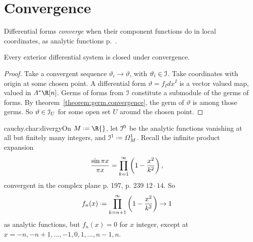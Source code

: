 \section{Convergence}
Differential forms \emph{converge} when their component functions do in local coordinates, as analytic functions p.~\pageref{section:convergence}.
\begin{theorem}\label{theorem:f.t.uniform}
Every exterior differential system is closed under convergence.
\end{theorem}
\begin{proof}
Take a convergent sequence \(\vartheta_i\to\vartheta\), with \(\vartheta_i\in\mathcal{I}\).
Take coordinates with origin at some chosen point.
A differential form
\(
\vartheta=f_I dx^I
\)
is a vector valued map, valued in \(\Lm{*}{\R[n]}\).
Germs of forms from \(\mathcal{I}\) constitute a submodule of the germs of forms.
By theorem~\vref{theorem:germ.convergence}, the germ of \(\vartheta\) is among those germs.
So \(\vartheta\in\mathcal{I}_U\) for some open set \(U\) around the chosen point.
\end{proof}
\begin{answer}{cauchy.char:divergy}On \(M\defeq\R{}\), let \(\mathcal{I}^0\) be the analytic functions vanishing at all but finitely many integers, and \(\II^1\defeq\nForms{1}{M}\).
Recall the infinite product expansion
\[
\frac{\sin \pi x}{\pi x}=\prod_{k=1}^{\infty}\left(1-\frac{x^2}{k^2}\right),
\]
convergent in the complex plane \cite{Ahlfors:1978} p. 197, \cite{Whittaker/Watson:1996} p. 239 \(12\!\cdot\!\!14\).
So
\[
f_n(x)\defeq\prod_{k=n+1}^{\infty}\pr{1-\frac{x^2}{k^2}}\to 1
\]
as analytic functions, but \(f_n(x)=0\) for \(x\) integer, except at \(x=-n,-n+1,\dots,-1,0,1,\dots,n-1,n\).
\end{answer}

